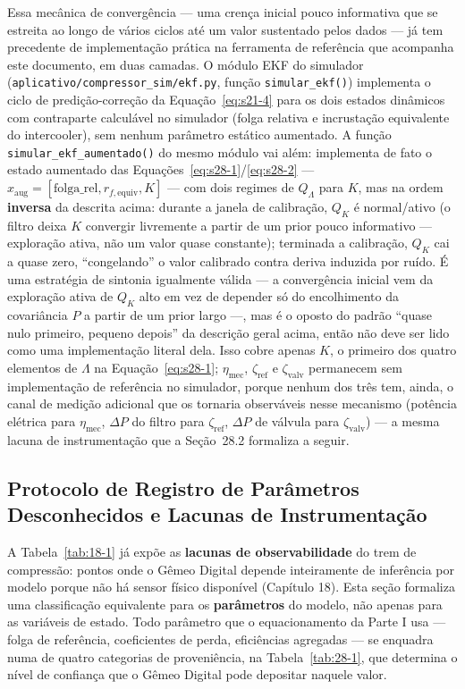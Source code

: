 \documentclass[12pt,a4paper]{article}
\numberwithin{equation}{section}
\numberwithin{table}{section}
\numberwithin{figure}{section}
\begin{document}
{Essa mecânica de convergência — uma crença inicial pouco informativa que se estreita ao longo de vários ciclos até um valor sustentado pelos dados — já tem precedente de implementação prática na ferramenta de referência que acompanha este documento, em duas camadas. O módulo EKF do simulador (\texttt{aplicativo/compressor\_sim/ekf.py}, função \texttt{simular\_ekf()}) implementa o ciclo de predição-correção da Equação~\eqref{eq:s21-4} para os dois estados dinâmicos com contraparte calculável no simulador (folga relativa e incrustação equivalente do intercooler), sem nenhum parâmetro estático aumentado. A função \texttt{simular\_ekf\_aumentado()} do mesmo módulo vai além: implementa de fato o estado aumentado das Equações~\eqref{eq:s28-1}/\eqref{eq:s28-2} — $x_{\text{aug}} = [\text{folga\_rel}, r_{f,\text{equiv}}, K]$ — com dois regimes de $Q_\Lambda$ para $K$, mas na ordem \textbf{inversa} da descrita acima: durante a janela de calibração, $Q_K$ é normal/ativo (o filtro deixa $K$ convergir livremente a partir de um prior pouco informativo — exploração ativa, não um valor quase constante); terminada a calibração, $Q_K$ cai a quase zero, ``congelando'' o valor calibrado contra deriva induzida por ruído. É uma estratégia de sintonia igualmente válida — a convergência inicial vem da exploração ativa de $Q_K$ alto em vez de depender só do encolhimento da covariância $P$ a partir de um prior largo —, mas é o oposto do padrão ``quase nulo primeiro, pequeno depois'' da descrição geral acima, então não deve ser lido como uma implementação literal dela. Isso cobre apenas $K$, o primeiro dos quatro elementos de $\Lambda$ na Equação~\eqref{eq:s28-1}; $\eta_{\text{mec}}$, $\zeta_{\text{ref}}$ e $\zeta_{\text{valv}}$ permanecem sem implementação de referência no simulador, porque nenhum dos três tem, ainda, o canal de medição adicional que os tornaria observáveis nesse mecanismo (potência elétrica para $\eta_{\text{mec}}$, $\Delta P$ do filtro para $\zeta_{\text{ref}}$, $\Delta P$ de válvula para $\zeta_{\text{valv}}$) — a mesma lacuna de instrumentação que a Seção~28.2 formaliza a seguir.

\subsection{Protocolo de Registro de Parâmetros Desconhecidos e Lacunas de Instrumentação}

A Tabela~\ref{tab:18-1} já expõe as \textbf{lacunas de observabilidade} do trem de compressão: pontos onde o Gêmeo Digital depende inteiramente de inferência por modelo porque não há sensor físico disponível (Capítulo 18). Esta seção formaliza uma classificação equivalente para os \textbf{parâmetros} do modelo, não apenas para as variáveis de estado. Todo parâmetro que o equacionamento da Parte I usa — folga de referência, coeficientes de perda, eficiências agregadas — se enquadra numa de quatro categorias de proveniência, na Tabela~\ref{tab:28-1}, que determina o nível de confiança que o Gêmeo Digital pode depositar naquele valor.

}
\end{document}
